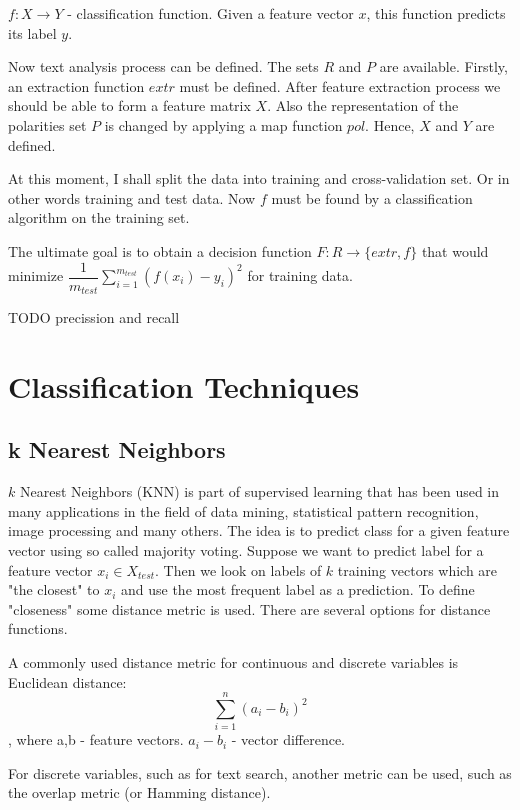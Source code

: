 \documentclass[12pt]{report}
\begin{document}
$f: X \rightarrow Y$ - classification function. Given a feature vector $x$, this function predicts its label $y$.

Now text analysis process can be defined. The sets $R$ and $P$ are available.
Firstly, an extraction function $extr$ must be defined. After feature extraction process we should be able to form a feature matrix $X$. Also the representation of the polarities set $P$ is changed by applying a map function $pol$. Hence, $X$ and $Y$ are defined.

At this moment, I shall split the data into training and cross-validation set. Or in other words training and test data. Now $f$ must be found by a classification algorithm on the training set.

The ultimate goal is to obtain a decision function $F : R \rightarrow \{extr, f\}$ that would minimize $\dfrac1 {m_{test}} \sum_{i=1}^{m_{test}} (f(x_{i})- y_{i})^2$ for training data. 

TODO precission and recall

\newpage

\chapter{Classification Techniques}

\section{k Nearest Neighbors}

$k$ Nearest Neighbors (KNN) is part of supervised learning that has been used in many applications in the field of data mining, statistical pattern recognition, image processing and many others. The idea is to predict class for a given feature vector using so called majority voting. Suppose we want to predict label for a feature vector $x_i \in X_{test}$. Then we look on labels of $k$ training vectors which are "the closest" to $x_i$ and use the most frequent label as a prediction. To define "closeness" some distance metric is used. There are several options for distance functions.

A commonly used distance metric for continuous and discrete variables is Euclidean distance:
$$ \sum_{i=1}^{n} (a_i - b_i)^2$$, where a,b - feature vectors. $a_i - b_i$ - vector difference.

For discrete variables, such as for text search, another metric can be used, such as the overlap metric (or Hamming distance).
\end{document}
